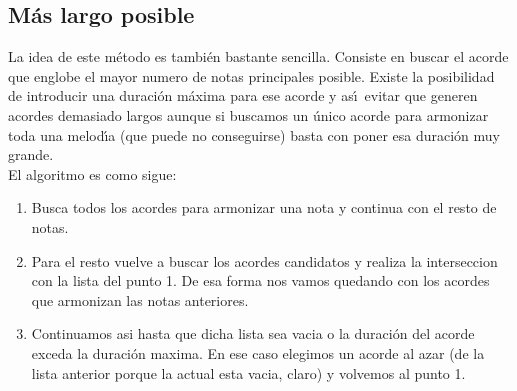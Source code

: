 \subsection{M\'as largo posible}
La idea de este m\'etodo es tambi\'en bastante sencilla. Consiste en 
buscar el acorde que englobe el mayor numero de notas principales
posible. Existe la posibilidad de introducir una duraci\'on m\'axima
para ese acorde y as\'\i ~evitar que generen acordes demasiado
largos aunque si buscamos un \'unico acorde para armonizar
toda una melod\'\i a (que puede no conseguirse) basta con poner esa
duraci\'on muy grande.\\
El algoritmo es como sigue:
\begin{enumerate}
\item Busca todos los acordes para armonizar una nota y continua
con el resto de notas.
\item Para el resto vuelve a buscar los acordes candidatos y 
realiza la interseccion con la lista del punto 1. De esa
forma nos vamos quedando con los acordes que armonizan las
notas anteriores.
\item Continuamos asi hasta que dicha lista sea vacia o la duraci\'on
del acorde exceda la duraci\'on maxima. En ese caso elegimos un 
acorde al azar (de la lista anterior porque la actual esta vacia, claro)
y volvemos al punto 1.
\end{enumerate}

